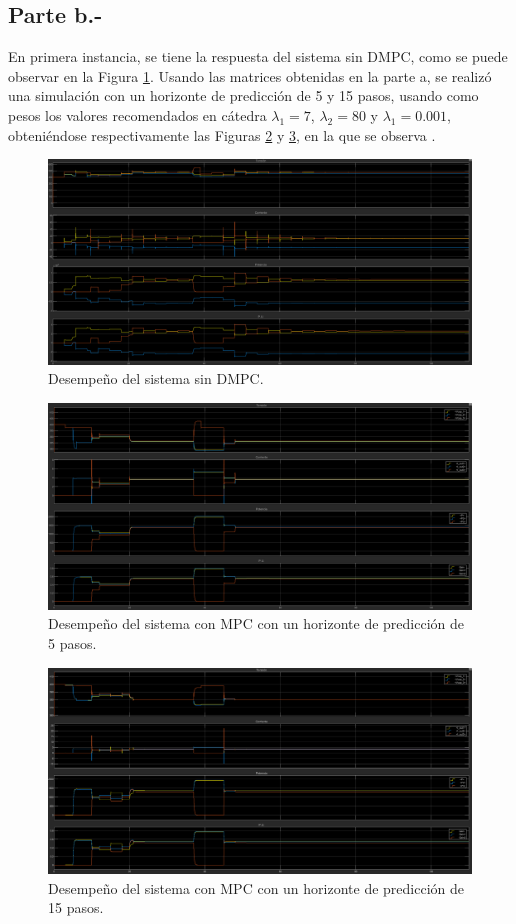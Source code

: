 
\subsection{Parte b.-}
En primera instancia, se tiene la respuesta del sistema sin DMPC, como se puede observar en la Figura \ref{respuesta_sin_mpc}. Usando las matrices obtenidas en la parte a, se realizó una simulación con un horizonte de predicción de 5 y 15 pasos, usando como pesos los valores recomendados en cátedra $\lambda_1 = 7$, $\lambda_2 = 80$ y $\lambda_1 = 0.001$, obteniéndose respectivamente las Figuras \ref{mpc_5_pasos} y \ref{mpc_15_pasos}, en la que se observa .


\begin{figure}
   \centering
   \includegraphics[width=0.5\linewidth]{Tarea 4/report/imagenes/p1a/respuesta_sin_mpc.png}
   \caption{Desempeño del sistema sin DMPC.}
   \label{respuesta_sin_mpc}
\end{figure}

\begin{figure}
   \centering
   \includegraphics[width=0.5\linewidth]{Tarea 4/report/imagenes/p1a/mpc_5_pasos.png}
   \caption{Desempeño del sistema con MPC con un horizonte de predicción de 5 pasos.}
   \label{mpc_5_pasos}
\end{figure}

\begin{figure}
   \centering
   \includegraphics[width=0.5\linewidth]{Tarea 4/report/imagenes/p1a/mpc_15_pasos.png}
   \caption{Desempeño del sistema con MPC con un horizonte de predicción de 15 pasos.}
   \label{mpc_15_pasos}
\end{figure}

